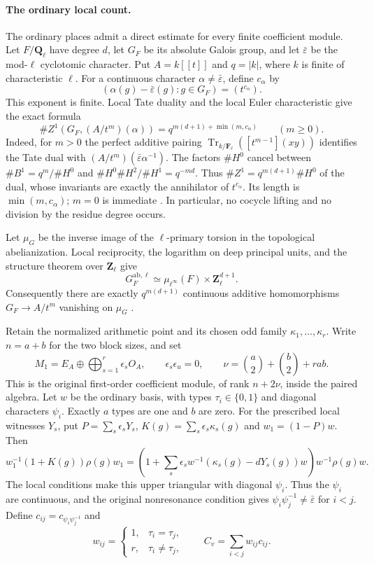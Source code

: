 \paragraph{The ordinary local count.}
The ordinary places admit a direct estimate for every finite
coefficient module. Let $F/\mathbf Q_\ell$ have degree $d$, let
$G_F$ be its absolute Galois group, and let $\bar\varepsilon$
be the mod-$\ell$ cyclotomic character. Put $A=k[[t]]$ and
$q=|k|$, where $k$ is finite of characteristic $\ell$.
For a continuous character $\alpha\ne\bar\varepsilon$, define
$c_\alpha$ by
\[
 (\alpha(g)-\bar\varepsilon(g):g\in G_F)=(t^{c_\alpha}).
\]
This exponent is finite. Local Tate duality and the local Euler
characteristic give the exact formula
\begin{equation}
 \#Z^1(G_F,(A/t^m)(\alpha))
       =q^{m(d+1)+\min(m,c_\alpha)}\qquad(m\geq0).
 \label{eq:selmer-ordinary-scalar-count}
\end{equation}
Indeed, for $m>0$ the perfect additive pairing
$\operatorname{Tr}_{k/\mathbf F_\ell}([t^{m-1}](xy))$
identifies the Tate dual with
$(A/t^m)(\bar\varepsilon\alpha^{-1})$.
The factors $\#H^0$ cancel between
$\#B^1=q^m/\#H^0$ and
$\#H^0\#H^2/\#H^1=q^{-md}$.
Thus $\#Z^1=q^{m(d+1)}\#H^0$ of the dual, whose invariants
are exactly the annihilator of $t^{c_\alpha}$.
Its length is $\min(m,c_\alpha)$; $m=0$ is immediate
\cite[I, Corollary~2.3 and Theorem~2.8]{milne-ordinary-local-duality}.
In particular, no cocycle lifting and no division by the residue
degree occurs.

Let $\mu_G$ be the inverse image of the $\ell$-primary torsion in
the topological abelianization. Local reciprocity, the logarithm on
deep principal units, and the structure theorem over $\mathbf Z_\ell$
give
\[
 G_F^{\mathrm{ab},\ell}\simeq
 \mu_{\ell^\infty}(F)\times\mathbf Z_\ell^{d+1}.
\]
Consequently there are exactly $q^{m(d+1)}$ continuous additive
homomorphisms $G_F\to A/t^m$ vanishing on $\mu_G$
\cite[I, Theorems~1.1 and~1.4]{milne-ordinary-local-reciprocity}.

Retain the normalized arithmetic point and its chosen odd family
$\kappa_1,\ldots,\kappa_r$. Write $n=a+b$ for the two block
sizes, and set
\[
 M_1=E_A\oplus\bigoplus_{s=1}^r\epsilon_sO_A,
 \qquad \epsilon_s\epsilon_u=0,\qquad
 \nu=\binom a2+\binom b2+rab.
\]
This is the original first-order coefficient module, of rank
$n+2\nu$, inside the paired algebra. Let $w$ be the ordinary
basis, with types $\tau_i\in\{0,1\}$ and diagonal characters
$\psi_i$. Exactly $a$ types are one and $b$ are zero.
For the prescribed local witnesses $Y_s$, put
$P=\sum_s\epsilon_sY_s$, $K(g)=\sum_s\epsilon_s\kappa_s(g)$
and $w_1=(1-P)w$. Then
\[
 w_1^{-1}(1+K(g))\rho(g)w_1
 =\left(1+\sum_s\epsilon_s
 w^{-1}(\kappa_s(g)-dY_s(g))w\right)w^{-1}\rho(g)w.
\]
The local conditions make this upper triangular with diagonal
$\psi_i$. Thus the $\psi_i$ are continuous, and the original
nonresonance condition gives
$\psi_i\psi_j^{-1}\ne\bar\varepsilon$ for $i<j$.
Define $c_{ij}=c_{\psi_i\psi_j^{-1}}$ and
\[
 w_{ij}=\begin{cases}
 1,&\tau_i=\tau_j,\\ r,&\tau_i\ne\tau_j,
 \end{cases}
 \qquad C_v=\sum_{i<j}w_{ij}c_{ij}.
\]

